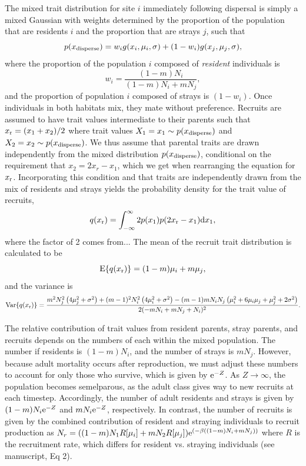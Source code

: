 \documentclass{revtex4}
\begin{document}
The mixed trait distribution for site $i$ immediately following dispersal is simply a mixed Gaussian with weights determined by the proportion of the population that are residents $i$ and the proportion that are strays $j$, such that 
\begin{equation}
  p(x_{\rm disperse}) = w_i g(x_i,\mu_i,\sigma) + (1-w_i)g(x_j,\mu_j,\sigma),
\end{equation}
where the proportion of the population $i$ composed of \emph{resident} individuals is
\begin{equation}
  w_i = \frac{(1-m)N_i}{(1-m)N_i + mN_j},
\end{equation}
and the proportion of population $i$ composed of strays is $(1-w_i)$.
Once individuals in both habitats mix, they mate without preference.
Recruits are assumed to have trait values intermediate to their parents such that $x_{\rm r} = (x_{1} + x_{2})/2$ where trait values $X_1=x_{1}\sim p(x_{\rm disperse})$ and $X_2=x_{2}\sim p(x_{\rm disperse})$.
We thus assume that parental traits are drawn independently from the mixed distribution $p(x_{\rm disperse})$, conditional on the requirement that $x_2 = 2x_r - x_1$, which we get when rearranging the equation for $x_{\rm r}$.
Incorporating this condition and that traits are independently drawn from the mix of residents and strays yields the probability density for the trait value of recruits,
\begin{equation}
  q(x_{\rm r}) = \int_{-\infty}^\infty 2p(x_1)p(2x_{\rm r}-x_1){\rm d}x_1,
\end{equation}
where the factor of 2 comes from...
The mean of the recruit trait distribution is calculated to be
\begin{equation}
{\rm E}\{q(x_{\rm r})\}=(1-m)\mu_i + m\mu_j,
\end{equation} 
and the variance is
\begin{equation}
  {\rm Var}\{q(x_{\rm r})\} = \frac{m^2 N_j^2 \left(4 \mu_j^2+\sigma ^2\right)+(m-1)^2 N_i^2 \left(4 \mu_i^2+\sigma ^2\right)-(m-1) m N_i N_j \left(\mu_i^2+6 \mu_i \mu_j+\mu_j^2+2 \sigma ^2\right)}{2 (-m N_i+m N_j+N_i)^2}.
\end{equation}

The relative contribution of trait values from resident parents, stray parents, and recruits depends on the numbers of each within the mixed population.
The number if residents is $(1-m)N_i$, and the number of strays is $mN_j$.
However, because adult mortality occurs after reproduction, we must adjust these numbers to account for only those who survive, which is given by ${\rm e}^{-Z}$.
As $Z\rightarrow \infty$, the population becomes semelparous, as the adult class gives way to new recruits at each timestep. 
Accordingly, the number of adult residents and strays is given by $(1-m)N_i{\rm e}^{-Z}$ and  $mN_i{\rm e}^{-Z}$, respectively.
In contrast, the number of recruits is given by the combined contribution of resident and straying individuals to recruit production as $N_r = ((1-m)N_1 R[\mu_i] + mN_2 R[\mu_j]){\rm e}^{(-\beta((1-m)N_i + mN_j))}$ where $R$ is the recruitment rate, which differs for resident vs. straying individuals (see manuscript, Eq 2).
\end{document}
